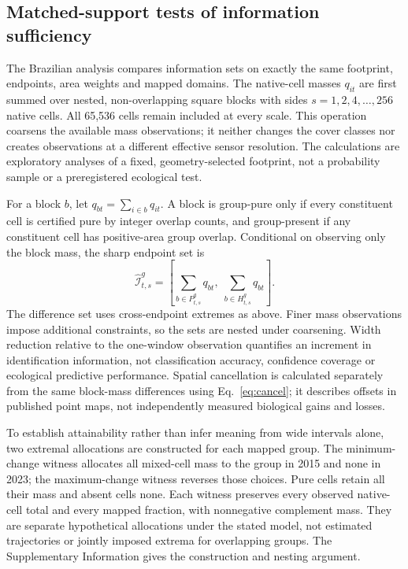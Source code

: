 \subsection{Matched-support tests of information sufficiency}
The Brazilian analysis compares information sets on exactly the same footprint, endpoints, area weights and mapped domains. The native-cell masses $q_{it}$ are first summed over nested, non-overlapping square blocks with sides $s=1,2,4,\ldots,256$ native cells. All 65,536 cells remain included at every scale. This operation coarsens the available mass observations; it neither changes the cover classes nor creates observations at a different effective sensor resolution. The calculations are exploratory analyses of a fixed, geometry-selected footprint, not a probability sample or a preregistered ecological test.

For a block $b$, let $q_{bt}=\sum_{i\in b}q_{it}$. A block is group-pure only if every constituent cell is certified pure by integer overlap counts, and group-present if any constituent cell has positive-area group overlap. Conditional on observing only the block mass, the sharp endpoint set is
\begin{equation}
\widehat{\mathcal I}_{t,s}^g=
\left[\sum_{b\in P_{t,s}^g}q_{bt},\;\sum_{b\in H_{t,s}^g}q_{bt}\right].\label{eq:block}
\end{equation}
The difference set uses cross-endpoint extremes as above. Finer mass observations impose additional constraints, so the sets are nested under coarsening. Width reduction relative to the one-window observation quantifies an increment in identification information, not classification accuracy, confidence coverage or ecological predictive performance. Spatial cancellation is calculated separately from the same block-mass differences using Eq.~\ref{eq:cancel}; it describes offsets in published point maps, not independently measured biological gains and losses.

To establish attainability rather than infer meaning from wide intervals alone, two extremal allocations are constructed for each mapped group. The minimum-change witness allocates all mixed-cell mass to the group in 2015 and none in 2023; the maximum-change witness reverses those choices. Pure cells retain all their mass and absent cells none. Each witness preserves every observed native-cell total and every mapped fraction, with nonnegative complement mass. They are separate hypothetical allocations under the stated model, not estimated trajectories or jointly imposed extrema for overlapping groups. The Supplementary Information gives the construction and nesting argument.

